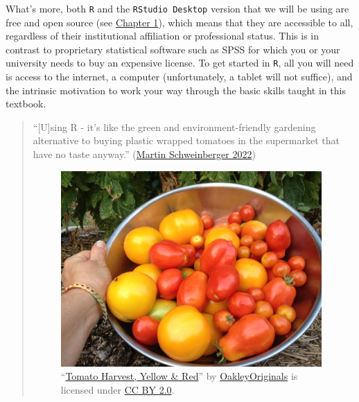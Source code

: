 \documentclass[
  letterpaper,
  DIV=11,
  numbers=noendperiod]{scrreprt}
\begin{document}
What's more, both \texttt{R} and the \texttt{RStudio\ Desktop} version
that we will be using are free and open source (see
\href{https://elenlefoll.github.io/RstatsTextbook/OpenScholarship.html}{Chapter
1}), which means that they are accessible to all, regardless of their
institutional affiliation or professional status. This is in contrast to
proprietary statistical software such as SPSS for which you or your
university needs to buy an expensive license. To get started in
\texttt{R}, all you will need is access to the internet, a computer
(unfortunately, a tablet will not suffice), and the intrinsic motivation
to work your way through the basic skills taught in this textbook.

\begin{quote}
``{[}U{]}sing R - it's like the green and environment-friendly gardening
alternative to buying plastic wrapped tomatoes in the supermarket that
have no taste anyway.''
(\href{https://slcladal.github.io/whyr.html}{Martin Schweinberger 2022})

\begin{figure}

\includegraphics[width=3.91667in,height=\textheight]{images/TomatoHarvest.jpg}

\caption{\label{fig-tomatoes}``\href{https://www.flickr.com/photos/47264866@N00/9455141053}{Tomato
Harvest, Yellow \& Red}'' by
\href{https://www.flickr.com/photos/47264866@N00}{OakleyOriginals} is
licensed under
\href{https://creativecommons.org/licenses/by/2.0/?ref=openverse}{CC BY
2.0}.}

\end{figure}%
\end{quote}
\end{document}
